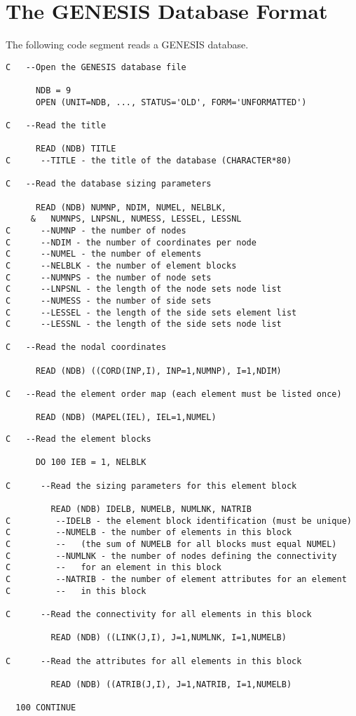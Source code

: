 \chapter{The GENESIS Database Format} \label{appx:genesis}

The following code segment reads a GENESIS database. 

\begin{verbatim}
C   --Open the GENESIS database file

      NDB = 9
      OPEN (UNIT=NDB, ..., STATUS='OLD', FORM='UNFORMATTED')

C   --Read the title

      READ (NDB) TITLE
C      --TITLE - the title of the database (CHARACTER*80)

C   --Read the database sizing parameters

      READ (NDB) NUMNP, NDIM, NUMEL, NELBLK,
     &   NUMNPS, LNPSNL, NUMESS, LESSEL, LESSNL
C      --NUMNP - the number of nodes
C      --NDIM - the number of coordinates per node
C      --NUMEL - the number of elements
C      --NELBLK - the number of element blocks
C      --NUMNPS - the number of node sets
C      --LNPSNL - the length of the node sets node list
C      --NUMESS - the number of side sets
C      --LESSEL - the length of the side sets element list
C      --LESSNL - the length of the side sets node list

C   --Read the nodal coordinates

      READ (NDB) ((CORD(INP,I), INP=1,NUMNP), I=1,NDIM)

C   --Read the element order map (each element must be listed once)

      READ (NDB) (MAPEL(IEL), IEL=1,NUMEL)
\end{verbatim}
\newpage
\begin{verbatim}
C   --Read the element blocks

      DO 100 IEB = 1, NELBLK

C      --Read the sizing parameters for this element block

         READ (NDB) IDELB, NUMELB, NUMLNK, NATRIB
C         --IDELB - the element block identification (must be unique)
C         --NUMELB - the number of elements in this block
C         --   (the sum of NUMELB for all blocks must equal NUMEL)
C         --NUMLNK - the number of nodes defining the connectivity
C         --   for an element in this block
C         --NATRIB - the number of element attributes for an element
C         --   in this block

C      --Read the connectivity for all elements in this block

         READ (NDB) ((LINK(J,I), J=1,NUMLNK, I=1,NUMELB)

C      --Read the attributes for all elements in this block

         READ (NDB) ((ATRIB(J,I), J=1,NATRIB, I=1,NUMELB)

  100 CONTINUE
\end{verbatim}
